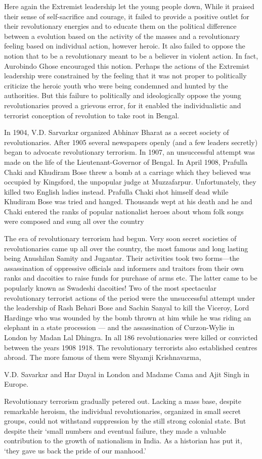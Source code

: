 Here again the Extremist leadership let the young people down, While it praised their sense of self-sacrifice and courage, it failed to provide a positive outlet for their revolutionary energies and to educate them on the political difference between a evolution based on the activity of the masses and a revolutionary feeling based on individual action, however heroic. It also failed to oppose the notion that to be a revolutionary meant to be a believer in violent action. In fact, Aurobindo Ghose encouraged this notion. Perhaps the actions of the Extremist leadership were constrained by the feeling that it was not proper to politically criticize the heroic youth who were being condemned and hunted by the authorities. But this failure to politically and ideologically oppose the young revolutionaries proved a grievous error, for it enabled the individualistic and terrorist conception of revolution to take root in Bengal.

In 1904, V.D. Sarvarkar organized Abhinav Bharat as a secret society of revolutionaries. After 1905 several newspapers openly (and a few leaders secretly) began to advocate revolutionary terrorism. In 1907, an unsuccessful attempt was made on the life of the Lieutenant-Governor of Bengal. In April 1908, Prafulla Chaki and Khudiram Bose threw a bomb at a carriage which they believed was occupied by Kingsford, the unpopular judge at Muzzafarpur. Unfortunately, they killed two English ladies instead. Prafulla Chaki shot himself dead while Khudiram Bose was tried and hanged. Thousands wept at his death and he and Chaki entered the ranks of popular nationalist heroes about whom folk songs were composed and sung all over the country

The era of revolutionary terrorism had begun. Very soon secret societies of revolutionaries came up all over the country, the most famous and long lasting being Anushilan Samity and Jugantar. Their activities took two forms---the assassination of oppressive officials and informers and traitors from their own ranks and dacoities to raise funds for purchase of arms etc. The latter came to be popularly known as Swadeshi dacoities! Two of the most spectacular revolutionary terrorist actions of the period were the unsuccessful attempt under the leadership of Rash Behari Bose and Sachin Sanyal to kill the Viceroy, Lord Hardinge who was wounded by the bomb thrown at him while he was riding an elephant in a state procession — and the assassination of Curzon-Wylie in London by Madan Lal Dhingra. In all 186 revolutionaries were killed or convicted between the years 1908­ 1918. The revolutionary terrorists also established centres abroad. The more famous of them were Shyamji Krishnavarma,

V.D. Savarkar and Har Dayal in London and Madame Cama and Ajit Singh in Europe.

Revolutionary terrorism gradually petered out. Lacking a mass base, despite remarkable heroism, the individual revolutionaries, organized in small secret groups, could not withstand suppression by the still strong colonial state. But despite their `small numbers and eventual failure, they made a valuable contribution to the growth of nationalism in India. As a historian has put it, `they gave us back the pride of our manhood.'
